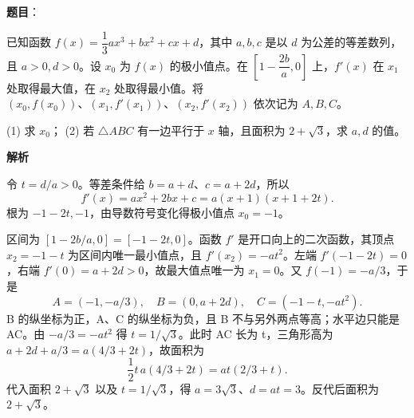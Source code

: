 \begin{answer}

\textbf{题目}：

已知函数 $f(x)=\dfrac13 ax^3+bx^2+cx+d$，其中 $a,b,c$ 是以 $d$ 为公差的等差数列，且 $a>0,d>0$。设 $x_0$ 为 $f(x)$ 的极小值点。在 $[1-\dfrac{2b}{a},0]$ 上，$f'(x)$ 在 $x_1$ 处取得最大值，在 $x_2$ 处取得最小值。将 $(x_0,f(x_0))\text{、}(x_1,f'(x_1))\text{、}(x_2,f'(x_2))$ 依次记为 $A,B,C$。

(1) 求 $x_0$；
(2) 若 $\triangle ABC$ 有一边平行于 $x$ 轴，且面积为 $2+\sqrt3$，求 $a,d$ 的值。

\textbf{解析}


令 $t=d/a>0$。等差条件给 $b=a+d$、$c=a+2d$，所以
\nopagebreak[4]
\[
f'(x)=ax^2+2bx+c=a(x+1)(x+1+2t).
\]
根为 $-1-2t,-1$，由导数符号变化得极小值点 $x_0=-1$。


区间为 $[1-2b/a,0]=[-1-2t,0]$。函数 $f'$ 是开口向上的二次函数，其顶点 $x_2=-1-t$ 为区间内唯一最小值点，且 $f'(x_2)=-at^2$。左端 $f'(-1-2t)=0$，右端 $f'(0)=a+2d>0$，故最大值点唯一为 $x_1=0$。又 $f(-1)=-a/3$，于是
\nopagebreak[4]
\[
A=(-1,-a/3),\quad B=(0,a+2d),\quad C=(-1-t,-at^2).
\]
B 的纵坐标为正，A、C 的纵坐标为负，且 B 不与另外两点等高；水平边只能是 AC。由 $-a/3=-at^2$ 得 $t=1/\sqrt3$。此时 AC 长为 t，三角形高为 $a+2d+a/3=a(4/3+2t)$，故面积为
\nopagebreak[4]
\[
\frac12t\,a(4/3+2t)=a t(2/3+t).
\]
代入面积 $2+\sqrt3$ 以及 $t=1/\sqrt3$，得 $a=3\sqrt3$、$d=at=3$。反代后面积为 $2+\sqrt3$。



\end{answer}
